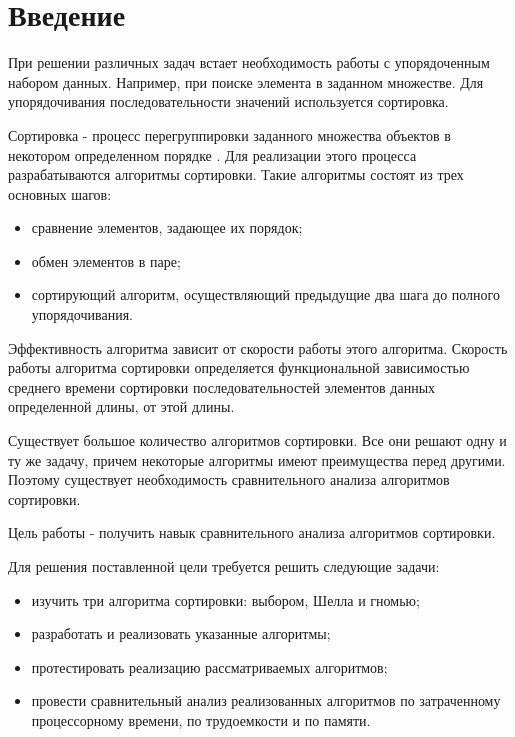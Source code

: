 \chapter*{Введение}

При решении различных задач встает необходимость работы с упорядоченным набором данных. Например, при поиске элемента в заданном множестве. Для упорядочивания последовательности значений используется сортировка.

Сортировка - процесс перегруппировки заданного множества объектов в некотором определенном порядке \cite{virt}. Для реализации этого процесса разрабатываются алгоритмы сортировки. Такие алгоритмы состоят из трех основных шагов: 

\begin{itemize}
	\item сравнение элементов, задающее их порядок;
	\item обмен элементов в паре;
	\item сортирующий алгоритм, осуществляющий предыдущие два шага до полного упорядочивания.
\end{itemize}

Эффективность алгоритма зависит от скорости работы этого алгоритма. Скорость работы алгоритма сортировки определяется функциональной зависимостью среднего времени сортировки последовательностей элементов
данных определенной длины, от этой длины.

Существует большое количество алгоритмов сортировки. Все они решают одну и ту же задачу, причем некоторые алгоритмы имеют преимущества перед другими. Поэтому существует необходимость сравнительного анализа алгоритмов сортировки. 

Цель работы - получить навык сравнительного анализа алгоритмов сортировки.

Для решения поставленной цели требуется решить следующие задачи:

\begin{itemize}
	\item изучить три алгоритма сортировки: выбором, Шелла и гномью;
	\item разработать и реализовать указанные алгоритмы;
	\item протестировать реализацию рассматриваемых алгоритмов;
	\item провести сравнительный анализ реализованных алгоритмов по затраченному процессорному времени, по трудоемкости и по памяти.
\end{itemize}